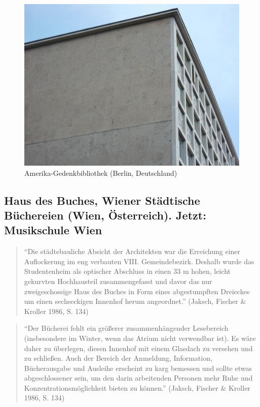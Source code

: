 \documentclass[a4paper,
fontsize=11pt,
oneside,
numbers=noperiodatend,
parskip=half-,
bibliography=totoc,
final
]{scrartcl}
\begin{document}
\begin{figure}[htbp]
\centering
\includegraphics{./img/027.jpg}
\caption{Amerika-Gedenkbibliothek (Berlin,
Deutschland)}
\end{figure}

\subsection*{Haus des Buches, Wiener Städtische Büchereien (Wien,
Österreich). Jetzt: Musikschule
Wien}\label{haus-des-buches-wiener-stuxe4dtische-buxfcchereien-wien-uxf6sterreich.-jetzt-musikschule-wien}

\begin{quote}
\enquote{Die städtebauliche Absicht der Architekten war die Erreichung
einer Auflockerung im eng verbauten VIII. Gemeindebezirk. Deshalb wurde
das Studentenheim als optischer Abschluss in einen 33 m hohen, leicht
gekurvten Hochhausteil zusammengefasst und davor das nur zweigeschossige
Haus des Buches in Form eines abgestumpften Dreieckes um einen
sechseckigen Innenhof herum angeordnet.} (Jaksch, Fischer \& Kroller
1986, S. 134)
\end{quote}

\begin{quote}
\enquote{Der Bücherei fehlt ein größerer zusammenhängender Lesebereich
(insbesondere im Winter, wenn das Atrium nicht verwendbar ist). Es wäre
daher zu überlegen, diesen Innenhof mit einem Glasdach zu versehen und
zu schließen. Auch der Bereich der Anmeldung, Information, Bücherausgabe
und Ausleihe erscheint zu karg bemessen und sollte etwas abgeschlossener
sein, um den darin arbeitenden Personen mehr Ruhe und
Konzentrationsmöglichkeit bieten zu können.} (Jaksch, Fischer \& Kroller
1986, S. 134)
\end{quote}
\end{document}
